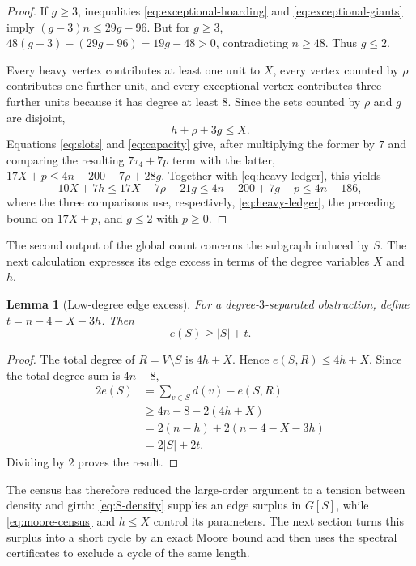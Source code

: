 \documentclass[11pt]{article}
\numberwithin{equation}{section}
\newtheorem{lemma}[theorem]{Lemma}
\theoremstyle{definition}
\theoremstyle{remark}
\begin{document}
\begin{proof}
If \(g\ge3\), inequalities \eqref{eq:exceptional-hoarding} and
\eqref{eq:exceptional-giants} imply
\((g-3)n\le29g-96\).  But for \(g\ge3\),
\(48(g-3)-(29g-96)=19g-48>0\), contradicting \(n\ge48\).  Thus \(g\le2\).

Every heavy vertex contributes at least one unit to \(X\), every vertex
counted by \(\rho\) contributes one further unit, and every exceptional
vertex contributes three further units because it has degree at least
\(8\).  Since the sets counted by \(\rho\) and \(g\) are disjoint,
\begin{equation}\label{eq:heavy-ledger}
  h+\rho+3g\le X.
\end{equation}
Equations \eqref{eq:slots} and \eqref{eq:capacity} give, after multiplying the
former by \(7\) and comparing the resulting \(7\tau_4+7p\) term with the latter,
\(17X+p\le4n-200+7\rho+28g\).  Together with
\eqref{eq:heavy-ledger}, this yields
\[
  10X+7h\le17X-7\rho-21g
  \le4n-200+7g-p\le4n-186,
\]
where the three comparisons use, respectively, \eqref{eq:heavy-ledger}, the
preceding bound on \(17X+p\), and \(g\le2\) with \(p\ge0\).
\end{proof}

The second output of the global count concerns the subgraph induced by
\(S\).  The next calculation expresses its edge excess in terms of the
degree variables \(X\) and \(h\).

\begin{lemma}[Low-degree edge excess]\label{lem:S-density}
For a degree-\(3\)-separated obstruction, define \(t=n-4-X-3h\).
Then
\begin{equation}\label{eq:S-density}
  e(S)\ge|S|+t.
\end{equation}
\end{lemma}

\begin{proof}
The total degree of \(R=V\setminus S\) is \(4h+X\).  Hence
\(e(S,R)\le4h+X\).  Since the total degree
sum is \(4n-8\),
\[
\begin{aligned}
  2e(S)
  &=
  \sum_{v\in S}d(v)-e(S,R)\\
  &\ge
  4n-8-2(4h+X)\\
  &=
  2(n-h)+2(n-4-X-3h)\\
  &=
  2|S|+2t.
\end{aligned}
\]
Dividing by \(2\) proves the result.
\end{proof}

The census has therefore reduced the large-order argument to a tension between
density and girth: \eqref{eq:S-density} supplies an edge surplus in \(G[S]\),
while \eqref{eq:moore-census} and \(h\le X\) control its parameters.  The next
section turns this surplus into a short cycle by an exact Moore bound and then
uses the spectral certificates to exclude a cycle of the same length.
\end{document}
